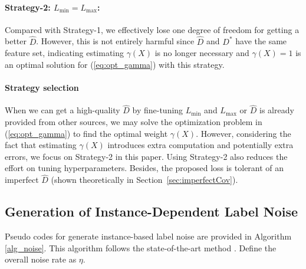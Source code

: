 \documentclass[final]{cvpr}
\newcommand{\estD}{{\hat D}}
\newcommand{\covpeer}{\text{CAL}}
\begin{document}
\paragraph{Strategy-2: $L_{\min} = L_{\max}$:}
Compared with Strategy-1, we effectively lose one degree of freedom for getting a better $\estD$. However, this is not entirely harmful since $\estD$ and $D^*$ have the same feature set, indicating estimating $\gamma(X)$ is no longer necessary and $\gamma(X)=1$ is an optimal solution for (\ref{eq:opt_gamma}) with this strategy.



\paragraph{Strategy selection}
When we can get a high-quality $\estD$ by fine-tuning $L_{\min}$ and $L_{\max}$ or $\estD$ is already provided from other sources, we may solve the optimization problem in (\ref{eq:opt_gamma}) to find the optimal weight $\gamma(X)$.
However, considering the fact that estimating $\gamma(X)$ introduces extra computation and potentially extra errors, we focus on Strategy-2 in this paper.
Using Strategy-2 also reduces the effort on tuning hyperparameters.
Besides, the proposed \covpeer{} loss is tolerant of an imperfect $\estD$ (shown theoretically in Section~\ref{sec:imperfectCov}).



\subsection{Generation of Instance-Dependent Label Noise}\label{sec:instance_noise_gen}

Pseudo codes for generate instance-based label noise are provided in Algorithm \ref{alg_noise}.
This algorithm follows the state-of-the-art method \cite{xia2020parts}.
Define the overall noise rate as $\eta$. 
\end{document}
